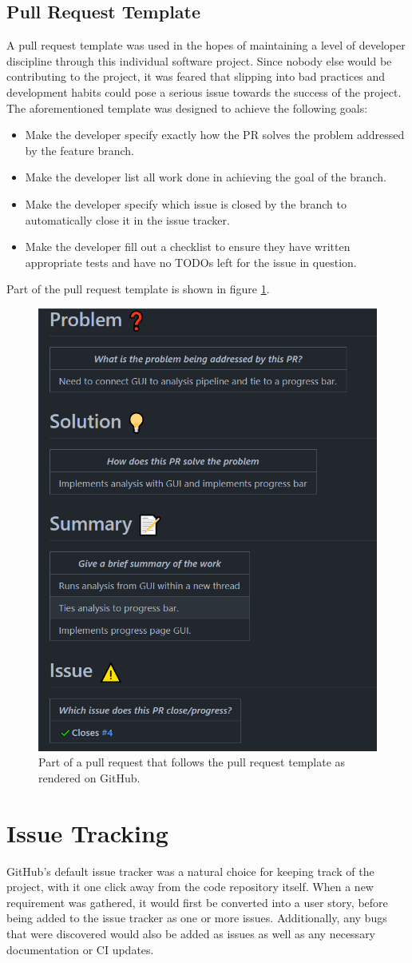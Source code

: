\documentclass{l4proj}
\begin{document}
\subsection{Pull Request Template}
A pull request template was used in the hopes of maintaining a level of developer discipline through this individual software project. Since nobody else would be contributing to the project, it was feared that slipping into bad practices and development habits could pose a serious issue towards the success of the project. The aforementioned template was designed to achieve the following goals:
\begin{itemize}
    \item Make the developer specify exactly how the PR solves the problem addressed by the feature branch.
    \item Make the developer list all work done in achieving the goal of the branch.
    \item Make the developer specify which issue is closed by the branch to automatically close it in the issue tracker.
    \item Make the developer fill out a checklist to ensure they have written appropriate tests and have no TODOs left for the issue in question.
\end{itemize}
Part of the pull request template is shown in figure \ref{fig:pr-template}.

\begin{figure}
    \centering
    \includegraphics[width=0.5\linewidth]{dissertation/images/PR-template.png}
    \caption{Part of a pull request that follows the pull request template as rendered on GitHub. }
    \label{fig:pr-template}
\end{figure}
\section{Issue Tracking}\label{issue-tracker}
GitHub's default issue tracker was a natural choice for keeping track of the project, with it one click away from the code repository itself. When a new requirement was gathered, it would first be converted into a user story, before being added to the issue tracker as one or more issues. Additionally, any bugs that were discovered would also be added as issues as well as any necessary documentation or CI updates.
\end{document}
